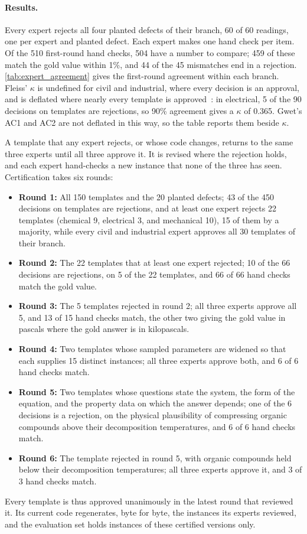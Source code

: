 \paragraph{Results.} Every expert rejects all four planted defects of their branch, 60 of 60
readings, one per expert and planted defect.
Each expert makes one hand check per item.
Of the 510 first-round hand checks, 504 have a number to compare; 459 of these match the gold value
within 1\%, and 44 of the 45 mismatches end in a rejection.
\autoref{tab:expert_agreement} gives the first-round agreement within each branch.
Fleiss' $\kappa$ is undefined for civil and industrial, where every decision is an approval, and is
deflated where nearly every template is approved~\citep{feinstein1990high}: in electrical, 5 of the
90 decisions on templates are rejections, so 90\% agreement gives a $\kappa$ of 0.365.
Gwet's AC1 and AC2 are not deflated in this way, so the table reports them beside $\kappa$.

A template that any expert rejects, or whose code changes, returns to the same three experts until
all three approve it.
It is revised where the rejection holds, and each expert hand-checks a new instance that none of
the three has seen.
Certification takes six rounds:
\begin{itemize}[nosep, leftmargin=*]
\item \textbf{Round 1:} All 150 templates and the 20 planted defects; 43 of the 450 decisions on
templates are rejections, and at least one expert rejects 22 templates (chemical 9, electrical 3,
and mechanical 10), 15 of them by a majority, while every civil and industrial expert approves all
30 templates of their branch.
\item \textbf{Round 2:} The 22 templates that at least one expert rejected; 10 of the 66 decisions
are rejections, on 5 of the 22 templates, and 66 of 66 hand checks match the gold value.
\item \textbf{Round 3:} The 5 templates rejected in round 2; all three experts approve all 5, and
13 of 15 hand checks match, the other two giving the gold value in pascals where the gold answer
is in kilopascals.
\item \textbf{Round 4:} Two templates whose sampled parameters are widened so that each supplies
15 distinct instances; all three experts approve both, and 6 of 6 hand checks match.
\item \textbf{Round 5:} Two templates whose questions state the system, the form of the equation,
and the property data on which the answer depends; one of the 6 decisions is a rejection, on the
physical plausibility of compressing organic compounds above their decomposition temperatures, and
6 of 6 hand checks match.
\item \textbf{Round 6:} The template rejected in round 5, with organic compounds held below their
decomposition temperatures; all three experts approve it, and 3 of 3 hand checks match.
\end{itemize}
Every template is thus approved unanimously in the latest round that reviewed it.
Its current code regenerates, byte for byte, the instances its experts reviewed, and the evaluation
set holds instances of these certified versions only.
